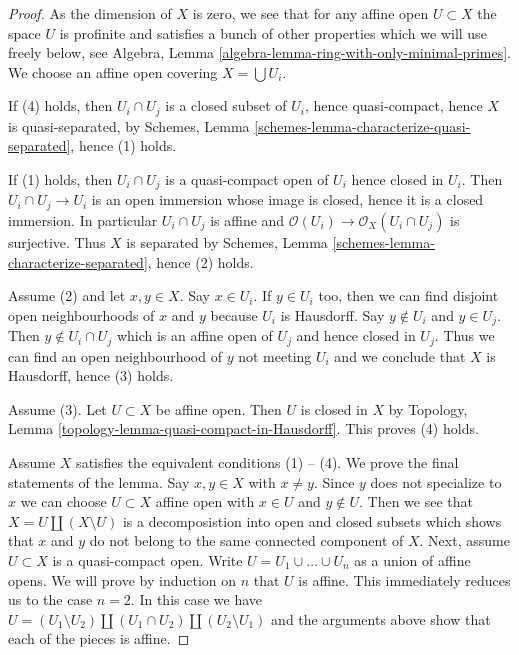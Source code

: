 \documentclass{stacks-project}
\theoremstyle{plain}
\theoremstyle{definition}
\theoremstyle{remark}
\numberwithin{equation}{subsection}
\begin{document}
\begin{proof}
As the dimension of $X$ is zero, we see that for any affine open
$U \subset X$ the space $U$ is profinite and satisfies
a bunch of other properties which we will use freely below, see
Algebra, Lemma \ref{algebra-lemma-ring-with-only-minimal-primes}.
We choose an affine open covering $X = \bigcup U_i$.

\medskip\noindent
If (4) holds, then $U_i \cap U_j$ is a closed subset of
$U_i$, hence quasi-compact, hence $X$ is quasi-separated,
by Schemes, Lemma \ref{schemes-lemma-characterize-quasi-separated},
hence (1) holds.

\medskip\noindent
If (1) holds, then $U_i \cap U_j$ is a quasi-compact open
of $U_i$ hence closed in $U_i$. Then $U_i \cap U_j \to U_i$
is an open immersion whose image is closed, hence it is a
closed immersion. In particular $U_i \cap U_j$ is affine
and $\mathcal{O}(U_i) \to \mathcal{O}_X(U_i \cap U_j)$ is surjective.
Thus $X$ is separated
by Schemes, Lemma \ref{schemes-lemma-characterize-separated},
hence (2) holds.

\medskip\noindent
Assume (2) and let $x, y \in X$. Say $x \in U_i$. If $y \in U_i$
too, then we can find disjoint open neighbourhoods of $x$ and $y$
because $U_i$ is Hausdorff. Say $y \not \in U_i$ and $y \in U_j$.
Then $y \not \in U_i \cap U_j$ which is an affine open of $U_j$
and hence closed in $U_j$. Thus we can find an open neighbourhood
of $y$ not meeting $U_i$ and we conclude that $X$ is Hausdorff,
hence (3) holds.

\medskip\noindent
Assume (3). Let $U \subset X$ be affine open.
Then $U$ is closed in $X$ by Topology, Lemma
\ref{topology-lemma-quasi-compact-in-Hausdorff}.
This proves (4) holds.

\medskip\noindent
Assume $X$ satisfies the equivalent conditions (1) -- (4).
We prove the final statements of the lemma. Say $x, y \in X$
with $x \not = y$. Since $y$ does not specialize to $x$ we can
choose $U \subset X$ affine open with $x \in U$ and $y \not \in U$.
Then we see that $X = U \amalg (X \setminus U)$ is a decomposistion
into open and closed subsets which shows that $x$ and $y$ do not belong
to the same connected component of $X$. Next, assume $U \subset X$
is a quasi-compact open. Write $U = U_1 \cup \ldots \cup U_n$ as a union
of affine opens. We will prove by induction on $n$ that $U$ is affine.
This immediately reduces us to the case $n = 2$. In this case we have
$U = (U_1 \setminus U_2) \amalg (U_1 \cap U_2) \amalg (U_2 \setminus U_1)$
and the arguments above show that each of the pieces is affine.
\end{proof}
\end{document}
